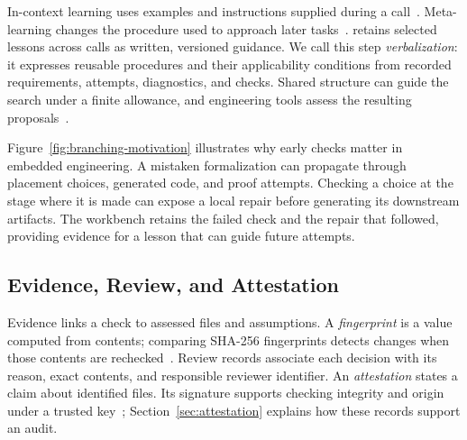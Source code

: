 In-context learning uses examples and instructions supplied during a call~\cite{vonoswald2023transformers}. Meta-learning changes the procedure used to approach later tasks~\cite{hospedales2022meta}. \workbench{} retains selected lessons across calls as written, versioned guidance. We call this step \emph{verbalization}: it expresses reusable procedures and their applicability conditions from recorded requirements, attempts, diagnostics, and checks. Shared structure can guide the search under a finite allowance, and engineering tools assess the resulting proposals~\cite{e28030332,tahat2026scp}.

Figure~\ref{fig:branching-motivation} illustrates why early checks matter in embedded engineering. A mistaken formalization can propagate through placement choices, generated code, and proof attempts. Checking a choice at the stage where it is made can expose a local repair before generating its downstream artifacts. The workbench retains the failed check and the repair that followed, providing evidence for a lesson that can guide future attempts.

\subsection{Evidence, Review, and Attestation}
Evidence links a check to assessed files and assumptions. A \emph{fingerprint} is a value computed from contents; comparing SHA-256 fingerprints detects changes when those contents are rechecked~\cite{nist_sha256,scpCheckpoint}. Review records associate each decision with its reason, exact contents, and responsible reviewer identifier. An \emph{attestation} states a claim about identified files. Its signature supports checking integrity and origin under a trusted key~\cite{intotoStatement,dsse}; Section~\ref{sec:attestation} explains how these records support an audit.
